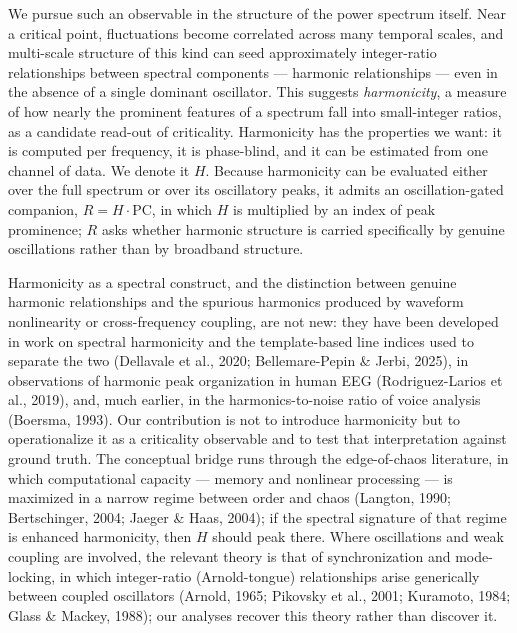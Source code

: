 \documentclass[11pt]{article}
\begin{document}
We pursue such an observable in the structure of the power spectrum itself. Near a critical point, fluctuations become correlated across many temporal scales, and multi-scale structure of this kind can seed approximately integer-ratio relationships between spectral components --- harmonic relationships --- even in the absence of a single dominant oscillator. This suggests \emph{harmonicity}, a measure of how nearly the prominent features of a spectrum fall into small-integer ratios, as a candidate read-out of criticality. Harmonicity has the properties we want: it is computed per frequency, it is phase-blind, and it can be estimated from one channel of data. We denote it $H$. Because harmonicity can be evaluated either over the full spectrum or over its oscillatory peaks, it admits an oscillation-gated companion, $R = H \cdot \mathrm{PC}$, in which $H$ is multiplied by an index of peak prominence; $R$ asks whether harmonic structure is carried specifically by genuine oscillations rather than by broadband structure.

Harmonicity as a spectral construct, and the distinction between genuine harmonic relationships and the spurious harmonics produced by waveform nonlinearity or cross-frequency coupling, are not new: they have been developed in work on spectral harmonicity and the template-based line indices used to separate the two (Dellavale et al., 2020; Bellemare-Pepin \& Jerbi, 2025), in observations of harmonic peak organization in human EEG (Rodriguez-Larios et al., 2019), and, much earlier, in the harmonics-to-noise ratio of voice analysis (Boersma, 1993). Our contribution is not to introduce harmonicity but to operationalize it as a criticality observable and to test that interpretation against ground truth. The conceptual bridge runs through the edge-of-chaos literature, in which computational capacity --- memory and nonlinear processing --- is maximized in a narrow regime between order and chaos (Langton, 1990; Bertschinger, 2004; Jaeger \& Haas, 2004); if the spectral signature of that regime is enhanced harmonicity, then $H$ should peak there. Where oscillations and weak coupling are involved, the relevant theory is that of synchronization and mode-locking, in which integer-ratio (Arnold-tongue) relationships arise generically between coupled oscillators (Arnold, 1965; Pikovsky et al., 2001; Kuramoto, 1984; Glass \& Mackey, 1988); our analyses recover this theory rather than discover it.
\end{document}
